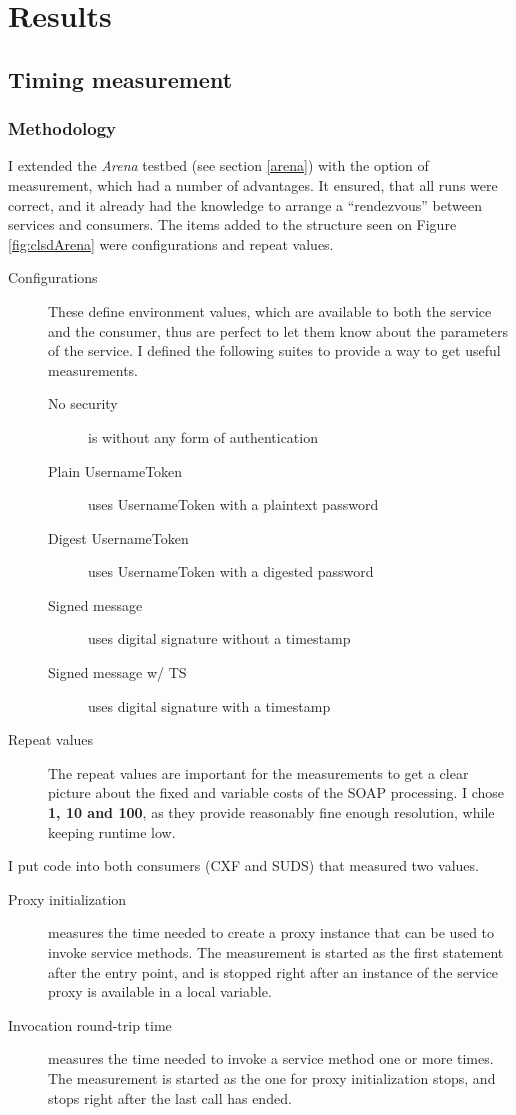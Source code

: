 \chapter{Results}

\section{Timing measurement}

\subsection{Methodology}

I extended the \emph{Arena} testbed (see section \ref{arena}) with the option of measurement, which had a number of advantages. It ensured, that all runs were correct, and it already had the knowledge to arrange a ``rendezvous'' between services and consumers. The items added to the structure seen on Figure \ref{fig:clsdArena} were configurations and repeat values.

\begin{description}
 \item[Configurations] These define environment values, which are available to both the service and the consumer, thus are perfect to let them know about the parameters of the service. I defined the following suites to provide a way to get useful measurements.
 \begin{description}
  \item[No security] is without any form of authentication
  \item[Plain UsernameToken] uses UsernameToken with a plaintext password
  \item[Digest UsernameToken] uses UsernameToken with a digested password
  \item[Signed message] uses digital signature without a timestamp
  \item[Signed message w/ TS] uses digital signature with a timestamp
 \end{description}
 \item[Repeat values] The repeat values are important for the measurements to get a clear picture about the fixed and variable costs of the SOAP processing. I chose \textbf{1, 10 and 100}, as they provide reasonably fine enough resolution, while keeping runtime low.
\end{description}

\noindent
I put code into both consumers (CXF and SUDS) that measured two values.
\begin{description}
 \item[Proxy initialization] measures the time needed to create a proxy instance that can be used to invoke service methods. The measurement is started as the first statement after the entry point, and is stopped right after an instance of the service proxy is available in a local variable.
 \item[Invocation round-trip time] measures the time needed to invoke a service method one or more times. The measurement is started as the one for proxy initialization stops, and stops right after the last call has ended.
\end{description}

